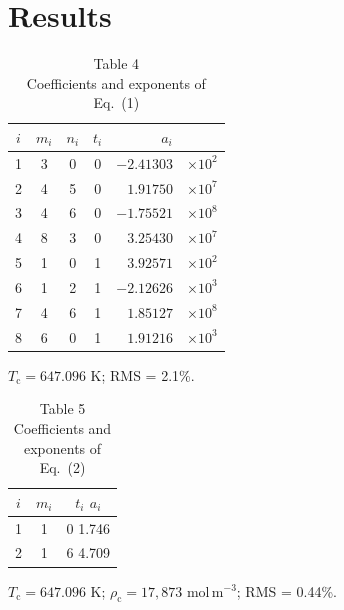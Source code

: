 \documentclass[11pt]{article}
\newcommand{\molm}{mol\,m$^{-3}$}
\begin{document}
\section{Results}

\begin{table}[htbp]
\centering
\caption*{Table 4\\ Coefficients and exponents of Eq.~(1)}
\begin{tabular}{ccccr@{}l}
\toprule
$i$ & $m_i$ & $n_i$ & $t_i$ & \multicolumn{2}{c}{$a_i$} \\
\midrule
1 & 3 & 0 & 0 & $-2.41303$ & $\times10^{2}$ \\
2 & 4 & 5 & 0 & $1.91750$   & $\times10^{7}$ \\
3 & 4 & 6 & 0 & $-1.75521$ & $\times10^{8}$ \\
4 & 8 & 3 & 0 & $3.25430$   & $\times10^{7}$ \\
5 & 1 & 0 & 1 & $3.92571$   & $\times10^{2}$ \\
6 & 1 & 2 & 1 & $-2.12626$ & $\times10^{3}$ \\
7 & 4 & 6 & 1 & $1.85127$   & $\times10^{8}$ \\
8 & 6 & 0 & 1 & $1.91216$   & $\times10^{3}$ \\
\bottomrule
\end{tabular}

\vspace{2pt}
\footnotesize $T_\mathrm{c} = 647.096$ K; RMS = 2.1\%.
\end{table}

\begin{table}[htbp]
\centering
\caption*{Table 5\\ Coefficients and exponents of Eq.~(2)}
\begin{tabular}{ccc}
\toprule
$i$ & $m_i$ & $t_i$ \hspace{2em} $a_i$ \\
\midrule
1 & 1 & 0 \hspace{2em} 1.746 \\
2 & 1 & 6 \hspace{2em} 4.709 \\
\bottomrule
\end{tabular}

\vspace{2pt}
\footnotesize $T_\mathrm{c} = 647.096$ K;
$\rho_\mathrm{c} = 17{,}873$ \molm; RMS = 0.44\%.
\end{table}
\end{document}
